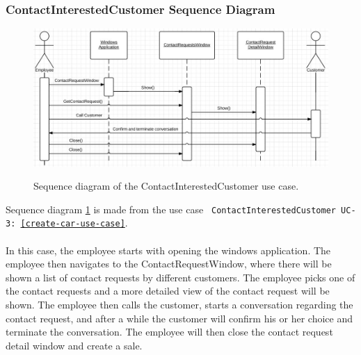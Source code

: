 \subsubsection{ContactInterestedCustomer Sequence Diagram}
\begin{figure}[H]
	\centering
		\includegraphics[width=\textwidth]{Figures/SequenceDiagram-ContactInterestedCustomer}\\
	\caption{Sequence diagram of the ContactInterestedCustomer use case.}
  \label{fig:SequenceDiagram-ContactInterestedCustomer}
\end{figure}

Sequence diagram \ref{fig:SequenceDiagram-ContactInterestedCustomer} is made from the use case \texttt{ ContactInterestedCustomer UC-3: \ref{create-car-use-case}}. \\\\
In this case, the employee starts with opening the windows application. The employee then navigates to the ContactRequestWindow, where there will be shown a list of contact requests by different customers. The employee picks one of the contact requests and a more detailed view of the contact request will be shown. The employee then calls the customer, starts a conversation regarding the contact request, and after a while the customer will confirm his or her choice and terminate the conversation. The employee will then close the contact request detail window and create a sale.

